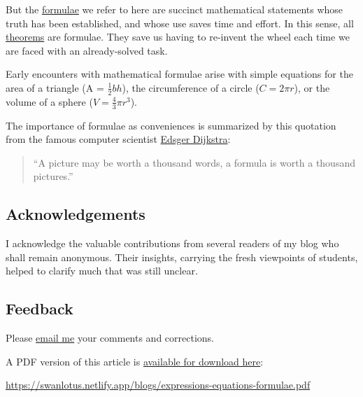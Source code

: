 \documentclass[
  a4paper,
]{article}
\begin{document}
But the \href{https://en.wikipedia.org/wiki/Formula}{formulae} we refer
to here are succinct mathematical statements whose truth has been
established, and whose use saves time and effort. In this sense, all
\href{https://en.wikipedia.org/wiki/Formula}{theorems} are formulae.
They save us having to re-invent the wheel each time we are faced with
an already-solved task.

Early encounters with mathematical formulae arise with simple equations
for the area of a triangle (A = \(\frac{1}{2}bh\)), the circumference of
a circle (\(C = 2\pi r\)), or the volume of a sphere
(\(V = \frac{4}{3}\pi r^3\)).

The importance of formulae as conveniences is summarized by this
quotation from the famous computer scientist
\href{https://en.wikipedia.org/wiki/Edsger_W._Dijkstra}{Edsger
Dijkstra}:

\begin{quote}
``A picture may be worth a thousand words, a formula is worth a thousand
pictures.''
\end{quote}

\subsection{Acknowledgements}\label{acknowledgements}

I acknowledge the valuable contributions from several readers of my blog
who shall remain anonymous. Their insights, carrying the fresh
viewpoints of students, helped to clarify much that was still unclear.

\subsection{Feedback}\label{feedback}

Please \href{mailto:feedback.swanlotus@gmail.com}{email me} your
comments and corrections.

\noindent A PDF version of this article is
\href{./expressions-equations-formulae.pdf}{available for download
here}:

\begin{small}

\begin{sffamily}

\url{https://swanlotus.netlify.app/blogs/expressions-equations-formulae.pdf}

\end{sffamily}

\end{small}
\end{document}
